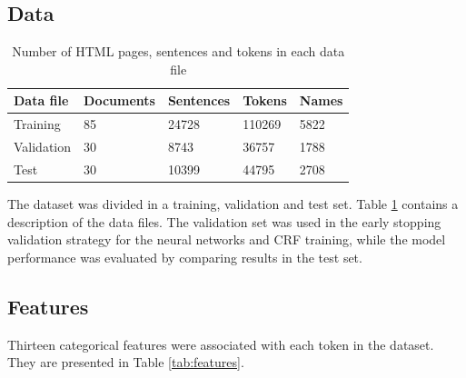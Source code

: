 \documentclass{nle}
\begin{document}
\subsection{Data}

\begin{table}[h]
  \small
  \begin{center}
    \begin{tabular}{ lllll }
      \toprule
      Data file & Documents & Sentences & Tokens & Names \\
      \midrule
      Training    & 85 & 24728 & 110269 & 5822 \\  
      Validation  & 30 & 8743  & 36757  & 1788 \\
      Test        & 30 & 10399 & 44795  & 2708 \\
      \bottomrule
    \end{tabular}
  \end{center}
  \caption{Number of HTML pages, sentences and tokens in each data file}
  \label{tab:dataset}
\end{table}

The dataset was divided in a training, validation and test set. Table \ref{tab:dataset} contains
a description of the data files. The validation set was used in the early stopping validation strategy
for the neural networks and CRF training, while the model performance was evaluated by comparing 
results in the test set.

\subsection{Features}

Thirteen categorical features were associated with each token in the dataset. They 
are presented in Table \ref{tab:features}.
\end{document}
